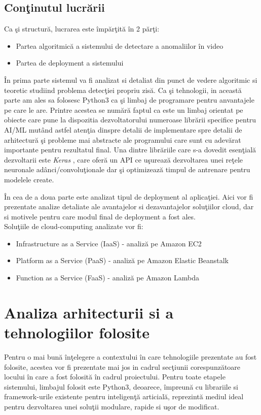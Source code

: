 \documentclass[a4paper,12pt]{report}
\begin{document}
\section{Conţinutul lucrării}
 Ca şi structură, lucrarea este împărţită în 2 părţi:
\begin{itemize}
\item Partea algoritmică a sistemului de detectare a anomaliilor în video
\item Partea de deployment a sistemului
\end{itemize}
\par În prima parte sistemul va fi analizat si detaliat din punct de vedere algoritmic si teoretic studiind problema detecţiei propriu zisă. Ca şi tehnologii, in această parte am ales sa folosesc Python3 ca şi limbaj de programare pentru anvantajele pe care le are. Printre acestea se numără faptul ca este un limbaj orientat pe obiecte care pune la dispozitia dezvoltatorului numeroase librării specifice pentru AI/ML mutând astfel atenţia dinspre detalii de implementare spre detalii de arhitectură şi probleme mai abstracte ale programului care sunt cu adevărat importante pentru rezultatul final. Una dintre librăriile care s-a dovedit esenţială dezvoltarii este \emph{Keras} \cite{2020keras}, care oferă un API ce uşurează dezvoltarea unei reţele neuronale adânci/convoluţionale dar şi optimizează timpul de antrenare pentru modelele create.  \par
În cea de a doua parte este analizat tipul de deployment al aplicaţiei. Aici vor fi prezentate analize detaliate ale avantajelor si dezavantajelor soluţiilor cloud, dar si motivele pentru care modul final de deployment a fost ales. \\
Soluţiile de cloud-computing analizate vor fi:
\begin{itemize}
\item Infrastructure as a Service (IaaS) - analiză pe Amazon EC2
\item Platform as a Service (PaaS) - analiză pe Amazon Elastic Beanstalk
\item Function as a Service (FaaS) - analiză pe Amazon Lambda
\end{itemize}
\chapter{Analiza arhitecturii si a tehnologiilor folosite}
\quad Pentru o mai bună înţelegere a contextului în care tehnologiile prezentate au fost folosite, acestea vor fi prezentate mai jos in cadrul secţiunii corespunzătoare locului în care a fost folosită în cadrul proiectului. Pentru toate etapele sistemului, limbajul folosit este Python3, deoarece, împreună cu librariile si framework-urile existente pentru inteligenţă articială, reprezintă mediul ideal pentru dezvoltarea unei soluţii modulare, rapide si uşor de modificat.
\end{document}
